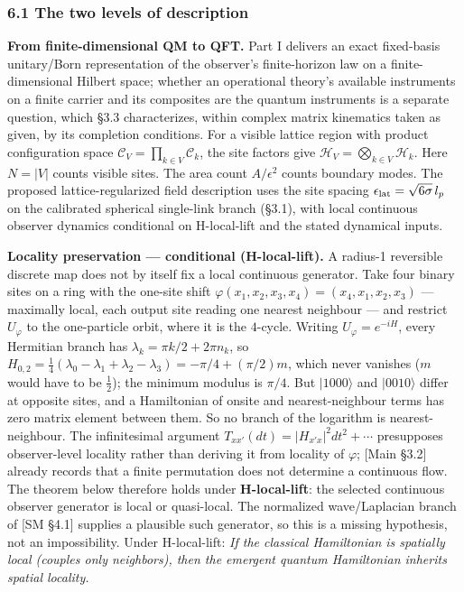 \documentclass[
]{article}
\begin{document}
\hypertarget{the-two-levels-of-description}{%
\subsubsection{6.1 The two levels of
description}\label{the-two-levels-of-description}}

\textbf{From finite-dimensional QM to QFT.} Part I delivers an exact
fixed-basis unitary/Born representation of the observer's finite-horizon
law on a finite-dimensional Hilbert space; whether an operational
theory's available instruments on a finite carrier and its composites
are the quantum instruments is a separate question, which §3.3
characterizes, within complex matrix kinematics taken as given, by its
completion conditions. For a visible lattice region with product
configuration space \(\mathcal C_V=\prod_{k\in V}\mathcal C_k\), the
site factors give \(\mathcal H_V=\bigotimes_{k\in V}\mathcal H_k\). Here
\(N=|V|\) counts visible sites. The area count \(A/\epsilon^2\) counts
boundary modes. The proposed lattice-regularized field description uses
the site spacing \(\epsilon_{\rm lat}=\sqrt{6\sigma}\,l_p\) on the
calibrated spherical single-link branch (§3.1), with local continuous
observer dynamics conditional on H-local-lift and the stated dynamical
inputs.

\textbf{Locality preservation --- conditional (H-local-lift).} A
radius-1 reversible discrete map does not by itself fix a local
continuous generator. Take four binary sites on a ring with the one-site
shift \(\varphi(x_1,x_2,x_3,x_4)=(x_4,x_1,x_2,x_3)\) --- maximally
local, each output site reading one nearest neighbour --- and restrict
\(U_\varphi\) to the one-particle orbit, where it is the \(4\)-cycle.
Writing \(U_\varphi=e^{-iH}\), every Hermitian branch has
\(\lambda_k=\pi k/2+2\pi n_k\), so
\(H_{0,2}=\tfrac14(\lambda_0-\lambda_1+\lambda_2-\lambda_3)=-\pi/4+(\pi/2)m\),
which never vanishes (\(m\) would have to be \(\tfrac12\)); the minimum
modulus is \(\pi/4\). But \(|1000\rangle\) and \(|0010\rangle\) differ
at opposite sites, and a Hamiltonian of onsite and nearest-neighbour
terms has zero matrix element between them. So no branch of the
logarithm is nearest-neighbour. The infinitesimal argument
\(T_{xx'}(dt)=|H_{x'x}|^2dt^2+\cdots\) presupposes observer-level
locality rather than deriving it from locality of \(\varphi\); {[}Main
§3.2{]} already records that a finite permutation does not determine a
continuous flow. The theorem below therefore holds under
\textbf{H-local-lift}: the selected continuous observer generator is
local or quasi-local. The normalized wave/Laplacian branch of {[}SM
§4.1{]} supplies a plausible such generator, so this is a missing
hypothesis, not an impossibility. Under H-local-lift: \emph{If the
classical Hamiltonian is spatially local (couples only neighbors), then
the emergent quantum Hamiltonian inherits spatial locality.}
\end{document}
